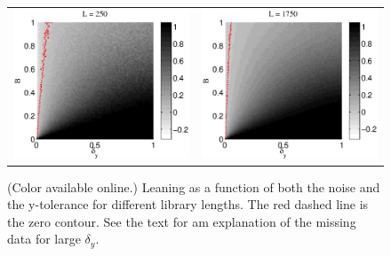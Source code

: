 \documentclass[a4paper,11pt,twocolumn]{article}
\begin{document}
\begin{figure}[ht]
\begin{tabular}{cc}
\includegraphics[scale=0.35]{SimpleIRexample_diffLpart3.eps} &
\includegraphics[scale=0.35]{SimpleIRexample_diffLpart4.eps}
\end{tabular}
\caption{(Color available online.) Leaning as a function of both the noise and the y-tolerance for different library lengths.  The red dashed line is the zero contour.  See the text for am explanation of the missing data for large $\delta_y$.}
\end{figure}
\end{document}
